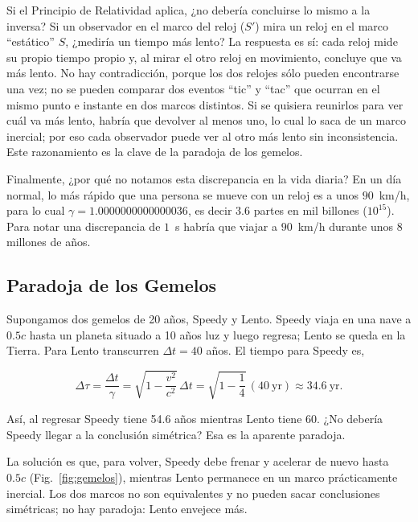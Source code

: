 

Si el Principio de Relatividad aplica, ¿no debería concluirse lo mismo a la inversa? Si un observador en el marco del reloj ($S'$) mira un reloj en el marco ``estático'' $S$, ¿mediría un tiempo más lento? La respuesta es sí: cada reloj mide su propio tiempo propio y, al mirar el otro reloj en movimiento, concluye que va más lento. No hay contradicción, porque los dos relojes sólo pueden encontrarse una vez; no se pueden comparar dos eventos ``tic'' y ``tac'' que ocurran en el mismo punto e instante en dos marcos distintos. Si se quisiera reunirlos para ver cuál va más lento, habría que devolver al menos uno, lo cual lo saca de un marco inercial; por eso cada observador puede ver al otro más lento sin inconsistencia. Este razonamiento es la clave de la paradoja de los gemelos.

Finalmente, ¿por qué no notamos esta discrepancia en la vida diaria? En un día normal, lo más rápido que una persona se mueve con un reloj es a unos $90$~km/h, para lo cual $\gamma=1.0000000000000036$, es decir $3.6$ partes en mil billones ($10^{15}$). Para notar una discrepancia de $1$~s habría que viajar a $90$~km/h durante unos 8 millones de años.

\subsection{Paradoja de los Gemelos}

Supongamos dos gemelos de 20 años, Speedy y Lento. Speedy viaja en una nave a $0.5c$ hasta un planeta situado a 10 años luz y luego regresa; Lento se queda en la Tierra. Para Lento transcurren $\Delta t = 40$ años. El tiempo para Speedy es,

$$
\Delta\tau = \frac{\Delta t}{\gamma} = \sqrt{1-\frac{v^2}{c^2}}\,\Delta t = \sqrt{1-\frac{1}{4}}\,(40~\text{yr}) \approx 34.6~\text{yr}.
$$

Así, al regresar Speedy tiene 54.6 años mientras Lento tiene 60. ¿No debería Speedy llegar a la conclusión simétrica? Esa es la aparente paradoja.

La solución es que, para volver, Speedy debe frenar y acelerar de nuevo hasta $0.5c$ (Fig.~\ref{fig:gemelos}), mientras Lento permanece en un marco prácticamente inercial. Los dos marcos no son equivalentes y no pueden sacar conclusiones simétricas; no hay paradoja: Lento envejece más.



